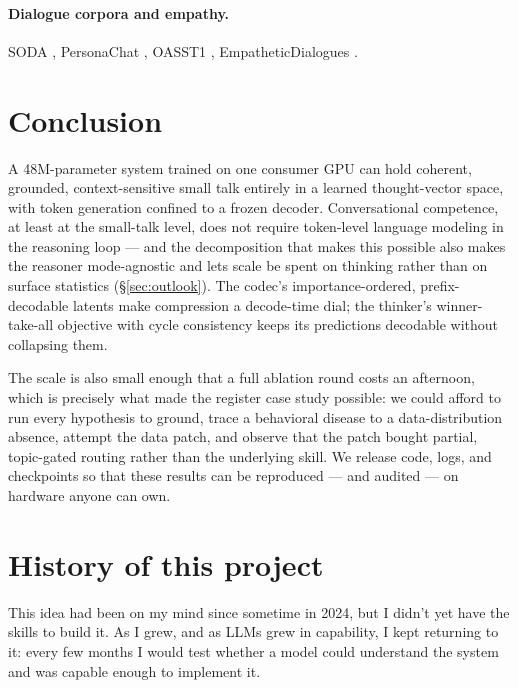 \documentclass[11pt]{article}
\begin{document}
\paragraph{Dialogue corpora and empathy.} SODA \citep{kim2023soda},
PersonaChat \citep{zhang2018personachat}, OASST1 \citep{kopf2023oasst},
EmpatheticDialogues \citep{rashkin2019empathetic}.

\section{Conclusion}
\label{sec:conclusion}
A 48M-parameter system trained on one consumer GPU can hold coherent,
grounded, context-sensitive small talk entirely in a learned thought-vector
space, with token generation confined to a frozen decoder. Conversational
competence, at least at the small-talk level, does not require token-level
language modeling in the reasoning loop --- and the decomposition that makes
this possible also makes the reasoner mode-agnostic and lets scale be spent
on thinking rather than on surface statistics (\S\ref{sec:outlook}). The
codec's importance-ordered, prefix-decodable latents make compression a
decode-time dial; the thinker's winner-take-all objective with cycle
consistency keeps its predictions decodable without collapsing them.

The scale is also small enough that a full ablation round costs an
afternoon, which is precisely what made the register case study possible: we
could afford to run every hypothesis to ground, trace a behavioral disease
to a data-distribution absence, attempt the data patch, and observe that
the patch bought partial, topic-gated routing rather than the underlying
skill. We release code, logs, and
checkpoints so that these results can be reproduced --- and audited --- on
hardware anyone can own.

\section*{History of this project}
\label{sec:history}
This idea had been on my mind since sometime in 2024, but I didn't yet have
the skills to build it. As I grew, and as LLMs grew in capability, I kept
returning to it: every few months I would test whether a model could
understand the system and was capable enough to implement it.
\end{document}
